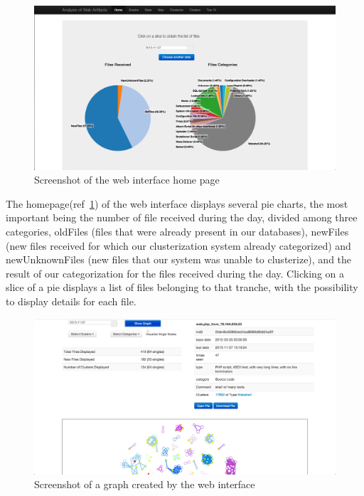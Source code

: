 \begin{figure}[tbh]
\centerline{\includegraphics[scale=0.2]{Images/honeyFace_home.jpg}}
\caption{Screenshot of the web interface home page\label{fig:web_home}}
\end{figure}

The homepage(ref~\ref{fig:web_home}) of the web interface displays several pie charts, the most important being the number of file received during the day, divided among three categories, oldFiles (files that were already present in our databases), newFiles (new files received for which our clusterization system already categorized) and newUnknownFiles (new files that our system was unable to clusterize), and the result of our categorization for the files received during the day. Clicking on a slice of a pie displays a list of files belonging to that tranche, with the possibility to display details for each file.

\begin{figure}[tbh]
\centerline{\includegraphics[scale=0.2]{Images/honeyFace_graph.jpg}}
\caption{Screenshot of a graph created by the web interface\label{fig:web_graph}}
\end{figure}

